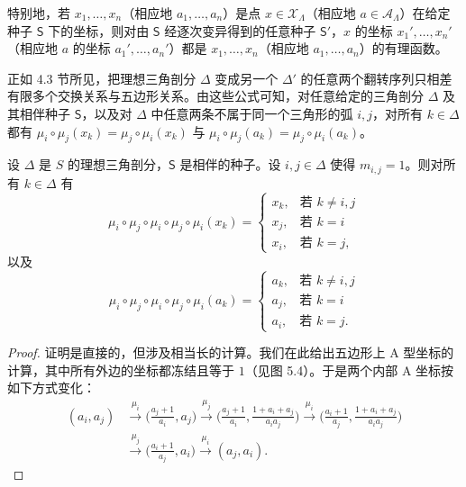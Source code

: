 \begin{remark}[5.9]
特别地，若 $x_1,\dots,x_n$（相应地 $a_1,\dots,a_n$）是点 $x\in\mathcal{X}_\Lambda$（相应地 $a\in\mathcal{A}_\Lambda$）在给定种子 $\mathsf{S}$ 下的坐标，则对由 $\mathsf{S}$ 经逐次变异得到的任意种子 $\mathsf{S}'$，$x$ 的坐标 $x_1',\dots,x_n'$（相应地 $a$ 的坐标 $a_1',\dots,a_n'$）都是 $x_1,\dots,x_n$（相应地 $a_1,\dots,a_n$）的有理函数。
\end{remark}

正如 4.3 节所见，把理想三角剖分 $\Delta$ 变成另一个 $\Delta'$ 的任意两个翻转序列只相差有限多个交换关系与五边形关系。由这些公式可知，对任意给定的三角剖分 $\Delta$ 及其相伴种子 $\mathsf{S}$，以及对 $\Delta$ 中任意两条不属于同一个三角形的弧 $i,j$，对所有 $k\in\Delta$ 都有 $\mu_i\circ\mu_j(x_k)=\mu_j\circ\mu_i(x_k)$ 与 $\mu_i\circ\mu_j(a_k)=\mu_j\circ\mu_i(a_k)$。

\begin{proposition}[{5.10（五边形关系）}]
设 $\Delta$ 是 $S$ 的理想三角剖分，$\mathsf{S}$ 是相伴的种子。设 $i,j\in\Delta$ 使得 $m_{i,j}=1$。则对所有 $k\in\Delta$ 有
\[
\mu_i\circ\mu_j\circ\mu_i\circ\mu_j\circ\mu_i(x_k)=\begin{cases}
x_k, & \text{若 } k\ne i,j\\
x_j, & \text{若 } k=i\\
x_i, & \text{若 } k=j,
\end{cases}
\]
以及
\[
\mu_i\circ\mu_j\circ\mu_i\circ\mu_j\circ\mu_i(a_k)=\begin{cases}
a_k, & \text{若 } k\ne i,j\\
a_j, & \text{若 } k=i\\
a_i, & \text{若 } k=j .
\end{cases}
\]
\end{proposition}

\begin{proof}
证明是直接的，但涉及相当长的计算。我们在此给出五边形上 A 型坐标的计算，其中所有外边的坐标都冻结且等于 $1$（见图 5.4）。于是两个内部 A 坐标按如下方式变化：
\begin{align*}
(a_i,a_j)&\xrightarrow{\ \mu_i\ }\Big(\frac{a_j+1}{a_i},a_j\Big)
\xrightarrow{\ \mu_j\ }\Big(\frac{a_j+1}{a_i},\frac{1+a_i+a_j}{a_ia_j}\Big)
\xrightarrow{\ \mu_i\ }\Big(\frac{a_i+1}{a_j},\frac{1+a_i+a_j}{a_ia_j}\Big)\\
&\xrightarrow{\ \mu_j\ }\Big(\frac{a_i+1}{a_j},a_i\Big)
\xrightarrow{\ \mu_i\ }(a_j,a_i).
\end{align*}
\end{proof}

